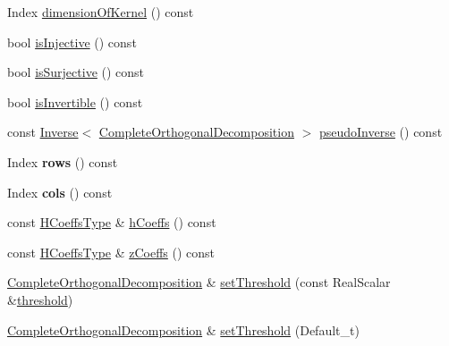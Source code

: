 \begin{DoxyCompactItemize}
\item 
Index \mbox{\hyperlink{class_eigen_1_1_complete_orthogonal_decomposition_aca2b59560c4851b7d7701872990a3426}{dimension\+Of\+Kernel}} () const
\item 
bool \mbox{\hyperlink{class_eigen_1_1_complete_orthogonal_decomposition_a2740067b81ec3e0ad20a2bea9a5a475f}{is\+Injective}} () const
\item 
bool \mbox{\hyperlink{class_eigen_1_1_complete_orthogonal_decomposition_a53dd287d3e1bbc548595d63880fd51bf}{is\+Surjective}} () const
\item 
bool \mbox{\hyperlink{class_eigen_1_1_complete_orthogonal_decomposition_a7c4f24f868295349a3bb99e5f217b069}{is\+Invertible}} () const
\item 
const \mbox{\hyperlink{class_eigen_1_1_inverse}{Inverse}}$<$ \mbox{\hyperlink{class_eigen_1_1_complete_orthogonal_decomposition}{Complete\+Orthogonal\+Decomposition}} $>$ \mbox{\hyperlink{class_eigen_1_1_complete_orthogonal_decomposition_a3c89639299720ce089435d26d6822d6f}{pseudo\+Inverse}} () const
\item 
\mbox{\label{class_eigen_1_1_complete_orthogonal_decomposition_ae49c60b9b4d7f74dc79a94bf20a14142}} 
Index {\bfseries rows} () const
\item 
\mbox{\label{class_eigen_1_1_complete_orthogonal_decomposition_a41e9ee4b8bd05c9021fd066169e1d76c}} 
Index {\bfseries cols} () const
\item 
const \mbox{\hyperlink{struct_eigen_1_1internal_1_1true__type}{H\+Coeffs\+Type}} \& \mbox{\hyperlink{class_eigen_1_1_complete_orthogonal_decomposition_ad25a868ecd499d6dda0119e4d3659504}{h\+Coeffs}} () const
\item 
const \mbox{\hyperlink{struct_eigen_1_1internal_1_1true__type}{H\+Coeffs\+Type}} \& \mbox{\hyperlink{class_eigen_1_1_complete_orthogonal_decomposition_a0b28c24992d313d4b04d109dcc7e5220}{z\+Coeffs}} () const
\item 
\mbox{\hyperlink{class_eigen_1_1_complete_orthogonal_decomposition}{Complete\+Orthogonal\+Decomposition}} \& \mbox{\hyperlink{class_eigen_1_1_complete_orthogonal_decomposition_aa9c9f7cbde9d58ca5552381b70ad8d82}{set\+Threshold}} (const Real\+Scalar \&\mbox{\hyperlink{class_eigen_1_1_complete_orthogonal_decomposition_a3909f07268496c0f08f1b57331d91075}{threshold}})
\item 
\mbox{\hyperlink{class_eigen_1_1_complete_orthogonal_decomposition}{Complete\+Orthogonal\+Decomposition}} \& \mbox{\hyperlink{class_eigen_1_1_complete_orthogonal_decomposition_a27c8da71874be7a64d6723bd0cae9f4f}{set\+Threshold}} (Default\+\_\+t)

\end{DoxyCompactItemize}
